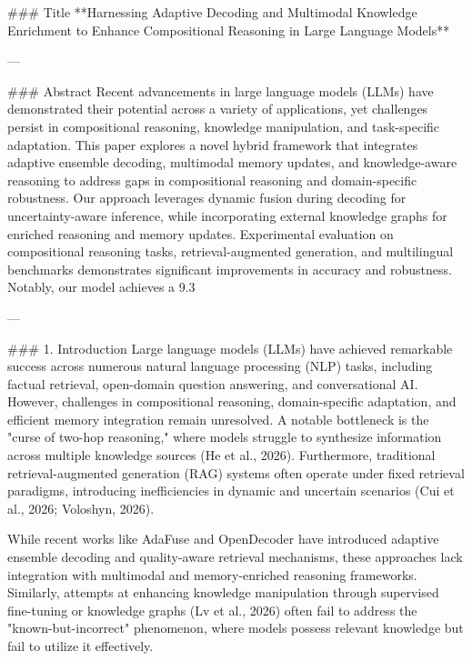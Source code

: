 ### Title
**Harnessing Adaptive Decoding and Multimodal Knowledge Enrichment to Enhance Compositional Reasoning in Large Language Models**

---

### Abstract
Recent advancements in large language models (LLMs) have demonstrated their potential across a variety of applications, yet challenges persist in compositional reasoning, knowledge manipulation, and task-specific adaptation. This paper explores a novel hybrid framework that integrates adaptive ensemble decoding, multimodal memory updates, and knowledge-aware reasoning to address gaps in compositional reasoning and domain-specific robustness. Our approach leverages dynamic fusion during decoding for uncertainty-aware inference, while incorporating external knowledge graphs for enriched reasoning and memory updates. Experimental evaluation on compositional reasoning tasks, retrieval-augmented generation, and multilingual benchmarks demonstrates significant improvements in accuracy and robustness. Notably, our model achieves a 9.3%

---

### 1. Introduction
Large language models (LLMs) have achieved remarkable success across numerous natural language processing (NLP) tasks, including factual retrieval, open-domain question answering, and conversational AI. However, challenges in compositional reasoning, domain-specific adaptation, and efficient memory integration remain unresolved. A notable bottleneck is the "curse of two-hop reasoning," where models struggle to synthesize information across multiple knowledge sources (He et al., 2026). Furthermore, traditional retrieval-augmented generation (RAG) systems often operate under fixed retrieval paradigms, introducing inefficiencies in dynamic and uncertain scenarios (Cui et al., 2026; Voloshyn, 2026).

While recent works like AdaFuse and OpenDecoder have introduced adaptive ensemble decoding and quality-aware retrieval mechanisms, these approaches lack integration with multimodal and memory-enriched reasoning frameworks. Similarly, attempts at enhancing knowledge manipulation through supervised fine-tuning or knowledge graphs (Lv et al., 2026) often fail to address the "known-but-incorrect" phenomenon, where models possess relevant knowledge but fail to utilize it effectively.

